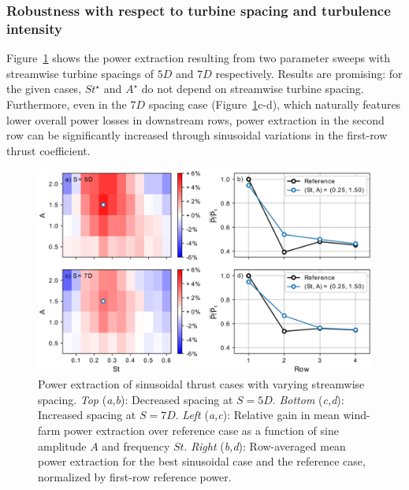 \documentclass[wes, manuscript]{copernicus}
\begin{document}
\subsubsection{Robustness with respect to turbine spacing and turbulence intensity}

Figure~\ref{fig:sinus_spacing} shows the power extraction resulting from two parameter sweeps with streamwise turbine spacings of $5D$ and $7D$ respectively. Results are promising: for the given cases, $St^\star$ and $A^\star$  do not depend on streamwise turbine spacing. Furthermore, even in the $7D$ spacing case (Figure~\ref{fig:sinus_spacing}c-d), which naturally features lower overall power losses in downstream rows, power extraction in the second row can be significantly increased through sinusoidal variations in the first-row thrust coefficient. 
\begin{figure}
	\centering
	\includegraphics[width=\textwidth]{gains_combined2.eps}
	\caption{Power extraction of sinusoidal thrust cases with varying streamwise spacing. \emph{Top} (\emph{a,b}): Decreased spacing at $S = 5D$. \emph{Bottom} (\emph{c,d}): Increased spacing at $S = 7D$.  \emph{Left} (\emph{a,c}): Relative gain in mean wind-farm power extraction over reference case as a function of sine amplitude $A$ and frequency $St$. \emph{Right} (\emph{b,d}): Row-averaged mean power extraction for the best sinusoidal case and the reference case, normalized by first-row reference power. \label{fig:sinus_spacing} }
\end{figure}
\end{document}
